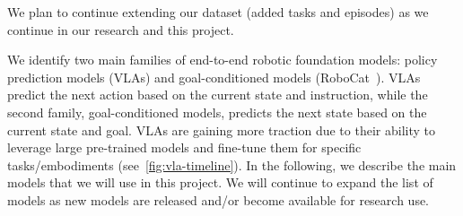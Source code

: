 We plan to continue extending our dataset (\ie added tasks and episodes) as we continue in our research and this project. 



We identify two main families of end-to-end robotic foundation models: policy prediction models (\eg VLAs) and goal-conditioned models (\eg RoboCat~\cite{bousmalis2023robocat}). VLAs predict the next action based on the current state and instruction, while the second family, goal-conditioned models, predicts the next state based on the current state and goal. VLAs are gaining more traction due to their ability to leverage large pre-trained models and fine-tune them for specific tasks/embodiments (see~\autoref{fig:vla-timeline}).
{In the following, we describe the main models that we will use in this project. We will continue to expand the list of models as new models are released and/or become available for research use.}

